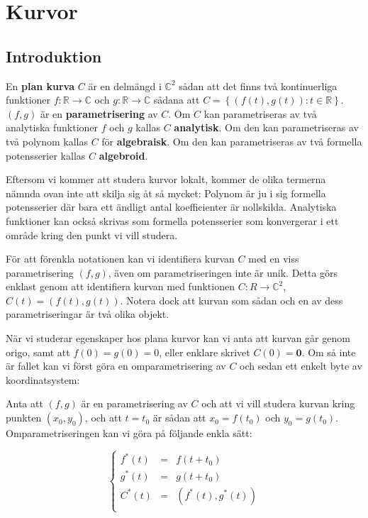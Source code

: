 \chapter{Kurvor}
\label{Curves}

\section{Introduktion}

\begin{Definition}
En \textbf{plan kurva} $C$ är en delmängd i $\mathbb{C}^2$ sådan att det finns två kontinuerliga funktioner $f : \mathbb{R} \rightarrow \mathbb{C}$ och 
$g : \mathbb{R} \rightarrow \mathbb{C}$ sådana att $C = \left\{\left(f(t), g(t)\right) : t \in \mathbb{R}\right\}$. $(f, g)$ är en \textbf{parametrisering} av $C$. Om $C$ kan parametriseras av två analytiska funktioner $f$ och $g$ kallas $C$ \textbf{analytisk}. Om den kan parametriseras av två polynom kallas $C$ för \textbf{algebraisk}. Om den kan parametriseras av två formella potensserier kallas $C$ \textbf{algebroid}.
\end{Definition}

Eftersom vi kommer att studera kurvor lokalt, kommer de olika termerna nämnda ovan inte att skilja sig åt så mycket: Polynom är ju i sig formella potensserier där bara ett ändligt antal koefficienter är nollskilda. Analytiska funktioner kan också skrivas som formella potensserier som konvergerar i ett område kring den punkt vi vill studera.

För att förenkla notationen kan vi identifiera kurvan $C$ med en viss parametrisering $(f, g)$, även om parametriseringen inte är unik. Detta görs enklast genom att identifiera kurvan med funktionen $C : R \rightarrow \mathbb{C}^2$, $C(t) = \left(f(t), g(t)\right)$. Notera dock att kurvan som sådan och en av dess parametriseringar är två olika objekt.

När vi studerar egenskaper hos plana kurvor kan vi anta att kurvan går
genom origo, samt att $f(0) = g(0) = 0$, eller enklare skrivet $C(0) = \mathbf{0}$. Om så inte är fallet kan vi först göra en omparametrisering av $C$ och sedan ett enkelt byte av koordinatsystem:

Anta att $(f, g)$ är en parametrisering av $C$ och att vi vill studera kurvan
kring punkten $\left(x_0, y_0\right)$, och att $t = t_0$ är sådan att $x_0 = f(t_0)$ och $y_0 = g(t_0)$. Omparametriseringen kan vi göra på följande enkla sätt:

\begin{equation*}
\left\{
\begin{array}{lll}
f^*(t) & = & f(t+t_0) \\
g^*(t) & = & g(t+t_0) \\
C^*(t) & = & (f^*(t),g^*(t)) \\
\end{array}
\right.
\end{equation*}

